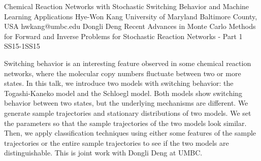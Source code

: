 \begin{talk}
  {Chemical Reaction Networks with Stochastic Switching Behavior and Machine Learning Applications}%
  {Hye-Won Kang}%
  {University of Maryland Baltimore County, USA}%
  {hwkang@umbc.edu}%
  {Dongli Deng}%
{Recent Advances in Monte Carlo Methods for Forward and Inverse Problems for Stochastic Reaction Networks - Part 1}
{}{SS15-1}{SS15}

			
Switching behavior is an interesting feature observed in some chemical reaction networks, where the molecular copy numbers fluctuate between two or more states. In this talk, we introduce two models with switching behavior: the Togashi-Kaneko model and the Schloegl model. Both models show switching behavior between two states, but the underlying mechanisms are different. We generate sample trajectories and stationary distributions of two models. We set the parameters so that the sample trajectories of the two models look similar. Then, we apply classification techniques using either some features of the sample trajectories or the entire sample trajectories to see if the two models are distinguishable. This is joint work with Dongli Deng at UMBC.



\end{talk}

